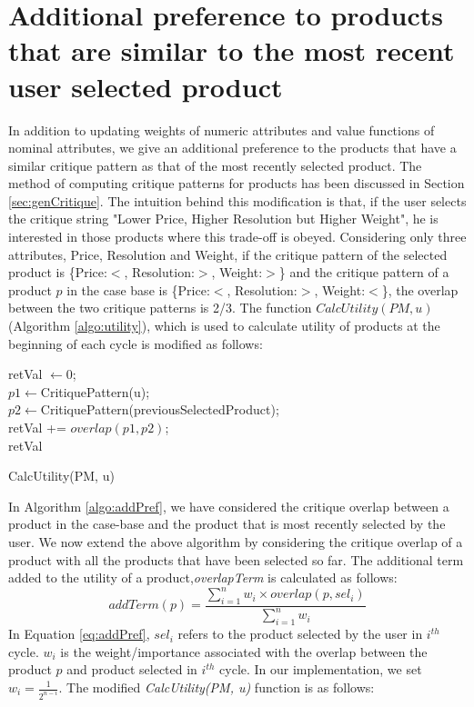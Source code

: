 \section{Additional preference to products that are similar to the most recent user selected product}
In addition to updating weights of numeric attributes and value functions of nominal attributes, we give an additional preference to the products that have a similar critique pattern as that of the most recently selected product.
The method of computing critique patterns for products has been discussed in Section \ref{sec:genCritique}.
The intuition behind this modification is that, if the user selects the critique string "Lower Price, Higher Resolution but Higher Weight", he is interested in those products where this trade-off is obeyed.
Considering only three attributes, Price, Resolution and Weight, if the critique pattern of the selected product is \{Price:$<$, Resolution:$>$, Weight:$>$\} and the critique pattern of a product $p$ in the case base is \{Price:$<$, Resolution:$>$, Weight:$<$\}, the overlap between the two critique patterns is 2/3.
The function $CalcUtility(PM, u)$ (Algorithm \ref{algo:utility}), which is used to calculate utility of products at the beginning of each cycle is modified as follows:

\begin{algorithm}[ht]
  \DontPrintSemicolon

  retVal $\gets 0$;\\
  $p1 \gets $CritiquePattern(u);\\
  $p2 \gets $CritiquePattern(previousSelectedProduct);\\
  retVal += $overlap(p1, p2)$;\\
  \Return retVal
  \caption{CalcUtility(PM, u)}
  \label{algo:addPref}
\end{algorithm}



In Algorithm \ref{algo:addPref}, we have considered the critique overlap between a product in the case-base and the product that is most recently selected by the user.
We now extend the above algorithm by considering the critique overlap of a product with all the products that have been selected so far.
The additional term added to the utility of a product,\textit{overlapTerm} is calculated as follows:
\begin{equation}
\label{eq:addPref}
addTerm(p) = \frac{\sum_{i=1}^{n} {w_i \times overlap(p,sel_i)}} {\sum_{i=1}^{n}w_i}
\end{equation}
In Equation \ref{eq:addPref}, $sel_i$ refers to the product selected by the user in $i^{th}$ cycle.
$w_i$ is the weight/importance associated with the overlap between the product $p$ and product selected in $i^{th}$ cycle.
In our implementation, we set $w_i = \frac{1}{2^{n-i}}$.
The modified \textit{CalcUtility(PM, u)} function is as follows:

